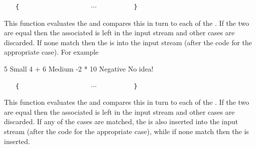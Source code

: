 \documentclass[oneside]{book}
\begin{document}
\begin{function}{\IntCaseF}
\begin{syntax}
 
~ ~ \verb|{|
~ ~ ~ ~  
~ ~ ~ ~  
~ ~ ~ ~ $\cdots$
~ ~ ~ ~  
~ ~ \verb|}|
~ ~ 
\end{syntax}
This function evaluates the  and
compares this in turn to each of the
. If the two are equal then the
associated  is left in the input stream
and other cases are discarded. If none
match then the  is into the input stream 
(after the code for the appropriate case).
For example
\begin{demohigh}
\IgnoreSpacesOn
{}
  {
    { 5 }       { Small }
    { 4 + 6 }   { Medium }
    { -2 * 10 } { Negative }
  }
  { No idea! }
\IgnoreSpacesOff
\end{demohigh}
\end{function}

\begin{function}{\IntCaseTF}
\begin{syntax}
 
~ ~ \verb|{|
~ ~ ~ ~  
~ ~ ~ ~  
~ ~ ~ ~ $\cdots$
~ ~ ~ ~  
~ ~ \verb|}|
~ ~ 
~ ~ 
\end{syntax}
This function evaluates the  and
compares this in turn to each of the
. If the two are equal then the
associated  is left in the input stream
and other cases are discarded. If any of the
cases are matched, the  is also inserted into the
input stream (after the code for the appropriate case), while if none
match then the  is inserted.
\end{function}
\end{document}
